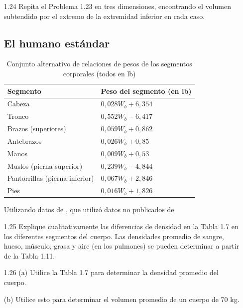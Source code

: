 \documentclass[12pt]{book}
\begin{document}
\begin{enumerate}
  (c) ¿Qué área es subtendida por el extremo de la extremidad inferior cuando $r_1 < r_2$? ¿Qué fracción de la obtenida en (a) es esta?

\item[1.24] Repita el Problema 1.23 en tres dimensiones, encontrando el volumen subtendido por el extremo de la extremidad inferior en cada caso.

\subsection*{El humano estándar}

\begin{table}[htbp]
\centering
\caption{Conjunto alternativo de relaciones de pesos de los segmentos corporales (todos en lb)}
\label{tab:116}
\begin{tabularx}{0.7\textwidth}{lX}
\toprule
\textbf{Segmento} & \textbf{Peso del segmento (en lb)} \\
\midrule
Cabeza & $0,028 W_b + 6,354$ \\
Tronco & $0,552 W_b - 6,417$ \\
Brazos (superiores) & $0,059 W_b + 0,862$ \\
Antebrazos & $0,026 W_b + 0,85$ \\
Manos & $0,009 W_b + 0,53$ \\
Muslos (pierna superior) & $0,239 W_b - 4,844$ \\
Pantorrillas (pierna inferior) & $0,067 W_b + 2,846$ \\
Pies & $0,016 W_b + 1,826$ \\
\bottomrule
\end{tabularx}
\begin{flushleft}
    \small Utilizando datos de \cite{25}, que utilizó datos no publicados de \cite{11}
\end{flushleft}
\end{table}

\item[1.25] Explique cualitativamente las diferencias de densidad en la Tabla 1.7 en los diferentes segmentos del cuerpo. Las densidades promedio de sangre, hueso, músculo, grasa y aire (en los pulmones) se pueden determinar a partir de la Tabla 1.11.

\item[1.26] (a) Utilice la Tabla 1.7 para determinar la densidad promedio del cuerpo.
  
  (b) Utilice esto para determinar el volumen promedio de un cuerpo de 70 kg.
  

\end{enumerate}
\end{document}
